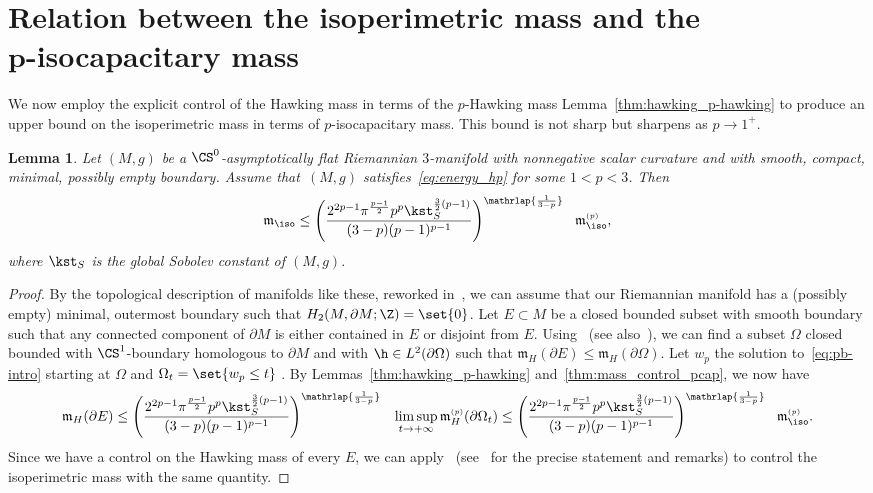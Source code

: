 \documentclass[10pt,a4paper]{amsart}
\numberwithin{equation}{section}
\newtheorem{Lemma}[Theorem]{Lemma}
\newcommand{\ma}{\mathfrak{m}}
\newcommand{\tp}[1][p]{{\text{\tiny$(#1)$}}}
\begin{document}
\section[Relation between the isoperimetric mass and the p-isocapacitary mass]{Relation between the isoperimetric mass and the \\ $\boldsymbol{p}$-isocapacitary mass}
\label{sec:4}
We now employ the explicit control of the Hawking mass in terms of the $p$-Hawking mass Lemma~\ref{thm:hawking_p-hawking} to produce an upper bound on the isoperimetric mass in terms of $p$-isocapacitary mass. This bound is not sharp but sharpens as $p\to 1^+$.
\begin{Lemma}\label{cor:lowerbound_miso}
 Let $(M,g)$ be a $\CS^0$-asymptotically flat Riemannian $3$-manifold with nonnegative scalar curvature and with smooth, compact, minimal, possibly empty boundary. Assume that~$(M,g)$ satisfies~\eqref{eq:energy_hp} for some $1<p<3$. Then
 \begin{equation*}%
 \ma_{\iso} \leq \Bigg( \frac{2^{2p-1}\pi^{\frac{p-1}{2}} p^{p}\kst_{ S}^{\frac{3}{2}(p-1)}}{(3-p) (p-1)^{p-1}} \Bigg)^{\mathrlap{\frac{1}{3-p}}}\;\;\; \ma^{\tp}_{\iso},
 \end{equation*}
 where $\kst_S$ is the global Sobolev constant of $(M,g)$.
\end{Lemma}

\begin{proof}
By the topological description of manifolds like these, reworked in~\cite[Lemma 2.8]{benatti_isoperimetricriemannianpenroseinequality_2022}, we can assume that our Riemannian manifold has a (possibly empty) minimal, outermost boundary such that $H_2(M,\partial M; \Z) = \set{0}$.
Let $E\subset M$ be a closed bounded subset with smooth boundary such that any connected component of $\partial M$ is either contained in $E$ or disjoint from $E$. Using~\cite[Theorem 6.1]{huisken_inversemeancurvatureflow_2001} (see also~\cite[Proposition 2.5]{benatti_isoperimetricriemannianpenroseinequality_2022}), we can find a subset $\Omega$ closed bounded with $\CS^{1}$-boundary homologous to $\partial M$ and with $\h \in L^2(\partial \Omega)$ such that $\ma_H(\partial E) \leq \ma_H(\partial \Omega)$. Let $w_p$ the solution to~\eqref{eq:pb-intro} starting at $\Omega$ and $\Omega_t = \set{ w_p \leq t}$ . By Lemmas~\ref{thm:hawking_p-hawking} and~\ref{thm:mass_control_pcap}, we now have
\[
\ma_H(\partial E) \leq \Bigg( \frac{2^{2p-1}\pi^{\frac{p-1}{2}} p^{p}\kst_{ S}^{\frac{3}{2}(p-1)}}{(3-p) (p-1)^{p-1}} \Bigg)^{\mathrlap{\frac{1}{3-p}}}\;\;\;\limsup_{t \to +\infty} \ma^{\tp}_H(\partial \Omega_t) \leq\Bigg( \frac{2^{2p-1}\pi^{\frac{p-1}{2}} p^{p}\kst_{ S}^{\frac{3}{2}(p-1)}}{(3-p) (p-1)^{p-1}} \Bigg)^{\mathrlap{\frac{1}{3-p}}}\;\;\;\ma^{\tp}_{\iso}.
\]
Since we have a control on the Hawking mass of every $E$, we can apply~\cite{jauregui_lowersemicontinuitymass0_2019} (see~\cite[Theorem~2.6]{benatti_isoperimetricriemannianpenroseinequality_2022} for the precise statement and remarks) to control the isoperimetric mass with the same quan\-tity.
\end{proof}
\end{document}
